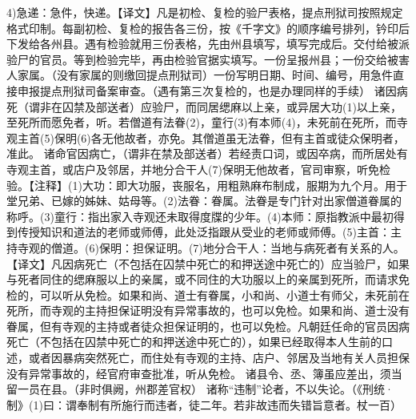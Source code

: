\documentclass[12pt,UTF8]{ctexbook}
\begin{document}
4)急递：急件，快递。【译文】凡是初检、复检的验尸表格，提点刑狱司按照规定格式印制。每副初检、复检的报告各三份，按《千字文》的顺序编号排列，钤印后下发给各州县。遇有检验就用三份表格，先由州县填写，填写完成后。交付给被派验尸的官员。等到检验完毕，再由检验官据实填写。一份呈报州县；一份交给被害人家属。（没有家属的则缴回提点刑狱司）一份写明日期、时间、编号，用急件直接申报提点刑狱司备案审查。（遇有第三次复检的，也是办理同样的手续）
诸因病死（谓非在囚禁及部送者）应验尸，而同居缌麻以上亲，或异居大功(1)以上亲，至死所而愿免者，听。若僧道有法眷(2)，童行(3)有本师(4)，未死前在死所，而寺观主首(5)保明(6)各无他故者，亦免。其僧道虽无法眷，但有主首或徒众保明者，准此。
诸命官因病亡，（谓非在禁及部送者）若经责口词，或因卒病，而所居处有寺观主首，或店户及邻居，并地分合干人(7)保明无他故者，官司审察，听免检验。【注释】(1)大功：即大功服，丧服名，用粗熟麻布制成，服期为九个月。用于堂兄弟、已嫁的姊妹、姑母等。(2)法眷：眷属。法眷是专门针对出家僧道眷属的称呼。(3)童行：指出家入寺观还未取得度牒的少年。(4)本师：原指教派中最初得到传授知识和道法的老师或师傅，此处泛指跟从受业的老师或师傅。(5)主首：主持寺观的僧道。(6)保明：担保证明。(7)地分合干人：当地与病死者有关系的人。【译文】凡因病死亡（不包括在囚禁中死亡的和押送途中死亡的）应当验尸，如果与死者同住的缌麻服以上的亲属，或不同住的大功服以上的亲属到死所，而请求免检的，可以听从免检。如果和尚、道士有眷属，小和尚、小道士有师父，未死前在死所，而寺观的主持担保证明没有异常事故的，也可以免检。如果和尚、道士没有眷属，但有寺观的主持或者徒众担保证明的，也可以免检。凡朝廷任命的官员因病死亡（不包括在囚禁中死亡的和押送途中死亡的），如果已经取得本人生前的口述，或者因暴病突然死亡，而住处有寺观的主持、店户、邻居及当地有关人员担保没有异常事故的，经官府审查批准，听从免检。
诸县令、丞、簿虽应差出，须当留一员在县。（非时俱阙，州郡差官权）
诸称“违制”论者，不以失论。（《刑统·制》(1)曰：谓奉制有所施行而违者，徒二年。若非故违而失错旨意者。杖一百）
\end{document}
